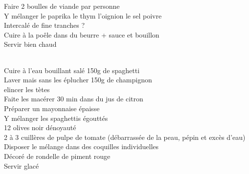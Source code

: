 \begin{minipage}[c]{\textwidth}
Faire 2 boulles de viande par personne\\
Y mélanger le paprika le thym l'oignion le sel poivre\\
Intercalé de fine tranches ?\\
Cuire à la  poêle dans du beurre + sauce et bouillon\\
Servir bien chaud\\
\\

\end{minipage}

\begin{minipage}[c]{\textwidth}
Cuire à l'eau bouillant salé 150g de spaghetti\\
Laver mais sans les éplucher 150g de champignon\\
elincer les tètes\\
 Faite les macérer 30 min dans du jus de citron\\
 Préparer un mayonnaise épaisse\\
 Y mélanger les spaghettis égouttés\\
 12 olives noir dénoyauté\\
 2 à 3 cuillères de pulpe de tomate (débarrassée de la peau, pépin et excès d'eau)\\
 Disposer le mélange dans des coquilles individuelles\\
Décoré de rondelle de piment rouge\\
Servir glacé\\
\\

\end{minipage}

